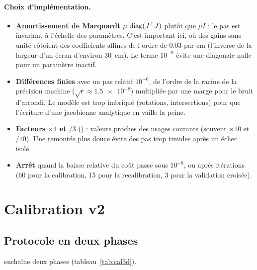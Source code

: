 \paragraph{Choix d'implémentation.}
\begin{itemize}
  \item \textbf{Amortissement de Marquardt} $\mu\,\operatorname{diag}(J^{\top} J)$ plutôt que $\mu I$ : le pas est invariant à l'échelle des paramètres. C'est important ici, où des gains sans unité côtoient des coefficients affines de l'ordre de \num{0.03} par cm (l'inverse de la largeur d'un écran d'environ \qty{30}{\centi\metre}). Le terme $10^{-9}$ évite une diagonale nulle pour un paramètre inactif.
  \item \textbf{Différences finies} avec un pas relatif $10^{-6}$, de l'ordre de la racine de la précision machine ($\sqrt{\epsilon} \approx \num{1.5e-8}$) multipliée par une marge pour le bruit d'arrondi. Le modèle est trop imbriqué (rotations, intersections) pour que l'écriture d'une jacobienne analytique en vaille la peine.
  \item \textbf{Facteurs $\times4$ et $/3$} (\empi) : valeurs proches des usages courants (souvent $\times10$ et $/10$). Une remontée plus douce évite des pas trop timides après un échec isolé.
  \item \textbf{Arrêt} quand la baisse relative du coût passe sous $10^{-8}$, ou après  itérations (60 pour la calibration, 15 pour la recalibration, 3 pour la validation croisée).
\end{itemize}

\section{Calibration v2}

\subsection{Protocole en deux phases}

 enchaîne deux phases (tableau~\ref{tab:cal3d}).

